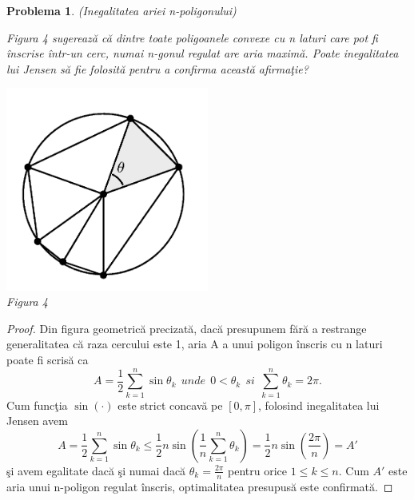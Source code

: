 \documentclass[a4paper,12pt,oneside]{report}
\newtheorem{problem}{Problema}
\begin{document}
\begin{problem} (Inegalitatea ariei n-poligonului)

Figura 4 sugereaz\u{a} c\u{a}  dintre toate poligoanele convexe cu n laturi care pot fi \^{i}nscrise \^{i}ntr-un cerc, numai n-gonul regulat are aria maxim\u{a}. Poate inegalitatea lui Jensen s\u{a} fie folosit\u{a} pentru a confirma aceast\u{a} afirma\c{t}ie?

\begin{center}
	\includegraphics[width=0.5\textwidth]{fig_pb6.png}
	\\ Figura 4
\end{center}
\end{problem}
\begin{proof}
Din figura geometric\u{a} precizat\u{a}, dac\u{a} presupunem f\u{a}r\u{a} a restrange generalitatea c\u{a} raza cercului este 1, aria A a unui poligon \^{i}nscris cu n laturi poate fi scris\u{a} ca
\begin{displaymath}
  A = \frac{1}{2}\sum_{k = 1}^{n} \sin \theta _{k} ~~unde ~~0< \theta _{k} ~~si~~ \sum_{k = 1}^n{\theta _{k}} = 2\pi.
\end{displaymath}
	Cum func\c{t}ia  \(\sin \left ( \cdot  \right )\) este strict concav\u{a} pe \(\left [ 0 , \pi  \right ]\), folosind inegalitatea lui Jensen avem
\begin{displaymath}
  A = \frac{1}{2}\sum_{k = 1}^{n} \sin \theta _{k}  \leq \frac{1}{2}n\sin\left ( \frac{1}{n}\sum_{k = 1}^{n}\theta _{k} \right ) = \frac{1}{2}n\sin \left ( \frac{2\pi }{n} \right ) = {A}'
\end{displaymath}
\c{s}i avem egalitate dac\u{a} \c{s}i numai dac\u{a} \(\theta _{k} = \frac{2\pi }{n}\) pentru orice \(1\leq k\leq n\). Cum \({A}'\) este aria unui n-poligon regulat \^{i}nscris, optimalitatea presupus\u{a} este confirmat\u{a}.
\end{proof}
\end{document}
